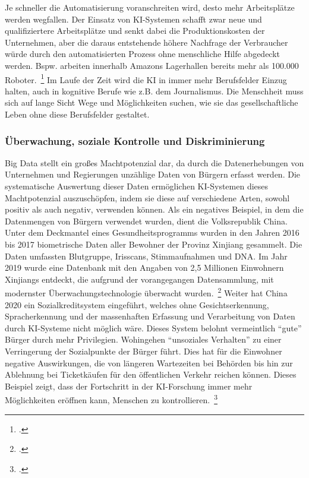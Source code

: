 Je schneller die Automatisierung voranschreiten wird, desto mehr Arbeitsplätze werden wegfallen. Der Einsatz von \ac{KI}-Systemen schafft zwar neue und qualifiziertere 
Arbeitsplätze und senkt dabei die Produktionskosten der Unternehmen, aber die daraus entstehende höhere Nachfrage der Verbraucher würde durch den automatisierten Prozess ohne menschliche Hilfe abgedeckt werden.
Bspw. arbeiten innerhalb Amazons Lagerhallen bereits mehr als 100.000 Roboter.~\footcite[\vglf][]{Kipper.2020} Im Laufe der Zeit wird die \ac{KI} in immer mehr Berufsfelder Einzug halten, auch in kognitive Berufe wie z.B. dem Journalismus. Die Menschheit muss sich 
auf lange Sicht Wege und Möglichkeiten suchen, wie sie das gesellschaftliche Leben ohne diese Berufsfelder gestaltet.
    
\subsubsection{Überwachung, soziale Kontrolle und Diskriminierung}

Big Data stellt ein großes Machtpotenzial dar, da durch die Datenerhebungen von Unternehmen und Regierungen unzählige Daten von Bürgern erfasst werden. Die systematische 
Auswertung dieser Daten ermöglichen \ac{KI}-Systemen dieses Machtpotenzial auszuschöpfen, indem sie diese auf verschiedene Arten, sowohl positiv als auch negativ, verwenden können.
Als ein negatives Beispiel, in dem die Datenmengen von Bürgern verwendet wurden, dient die Volksrepublik China. Unter dem Deckmantel eines Gesundheitsprogramms wurden in den Jahren 2016 bis 2017 biometrische Daten aller
Bewohner der Provinz Xinjiang gesammelt. Die Daten umfassten Blutgruppe, Irisscans, Stimmaufnahmen und DNA. Im Jahr 2019 wurde eine Datenbank mit den Angaben von 2,5 Millionen
Einwohnern Xinjiangs entdeckt, die aufgrund der vorangegangen Datensammlung, mit modernster Überwachungstechnologie überwacht wurden.~\footcite[\vglf][]{Kipper.2020}
Weiter hat China 2020 ein Sozialkreditsystem eingeführt, welches ohne Gesichtserkennung, Spracherkennung und der massenhaften Erfassung und Verarbeitung von Daten durch
\ac{KI}-Systeme nicht möglich wäre. Dieses System belohnt vermeintlich \enquote{gute} Bürger durch mehr Privilegien. Wohingehen \enquote{unsoziales Verhalten} zu einer Verringerung der
Sozialpunkte der Bürger führt. Dies hat für die Einwohner negative Auswirkungen, die von längeren Wartezeiten bei Behörden bis hin zur Ablehnung bei Ticketkäufen für den öffentlichen Verkehr
reichen können. Dieses Beispiel zeigt, dass der Fortschritt in der \ac{KI}-Forschung immer mehr Möglichkeiten eröffnen kann, Menschen zu kontrollieren.~\footcite[\vglf][]{Kipper.2020}

